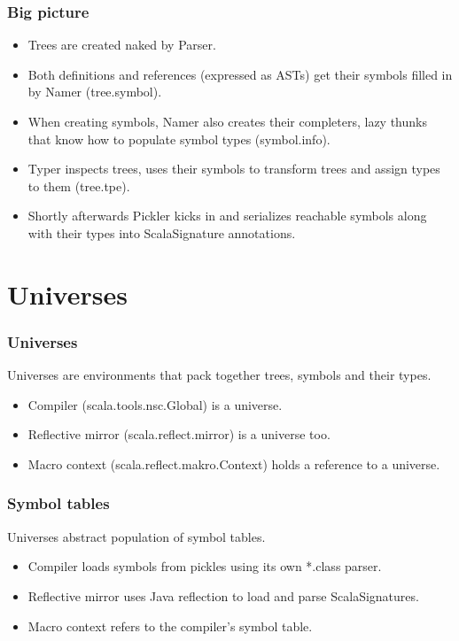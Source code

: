 \documentclass[hyperref={bookmarks=false}]{beamer}
\begin{document}
\begin{frame}[fragile]
\frametitle{Big picture}

\begin{itemize}
\item Trees are created naked by Parser.
\item Both definitions and references (expressed as ASTs) get their symbols filled in by Namer (tree.symbol).
\item When creating symbols, Namer also creates their completers, lazy thunks that know how to populate symbol types (symbol.info).
\item Typer inspects trees, uses their symbols to transform trees and assign types to them (tree.tpe).
\item Shortly afterwards Pickler kicks in and serializes reachable symbols along with their types into ScalaSignature annotations.
\end{itemize}
\end{frame}

\section{Universes}

\begin{frame}[fragile]
\frametitle{Universes}

Universes are environments that pack together trees, symbols and their types.

\begin{itemize}
\item Compiler (scala.tools.nsc.Global) is a universe.
\item Reflective mirror (scala.reflect.mirror) is a universe too.
\item Macro context (scala.reflect.makro.Context) holds a reference to a universe.
\end{itemize}
\end{frame}

\begin{frame}[fragile]
\frametitle{Symbol tables}

Universes abstract population of symbol tables.

\begin{itemize}
\item Compiler loads symbols from pickles using its own *.class parser.
\item Reflective mirror uses Java reflection to load and parse ScalaSignatures.
\item Macro context refers to the compiler's symbol table.
\end{itemize}
\end{frame}
\end{document}

